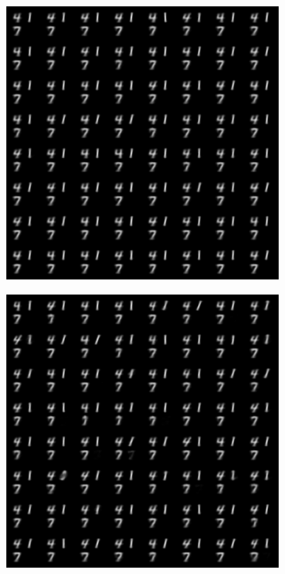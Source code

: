 \documentclass{article}
\begin{document}
\begin{figure}[!h]
    \begin{subfigure}[b]{.24\linewidth}
        \centering
        \includegraphics[width=\linewidth]{multimnist_mmvae_condition_on_image_text_417_image_sample.png}
        \caption{}
    \end{subfigure}
    \begin{subfigure}[b]{.24\linewidth}
        \centering
        \includegraphics[width=\linewidth]{multimnist_mmvae_condition_on_text_417_image_sample.png}

\end{subfigure}
\end{figure}
\end{document}
